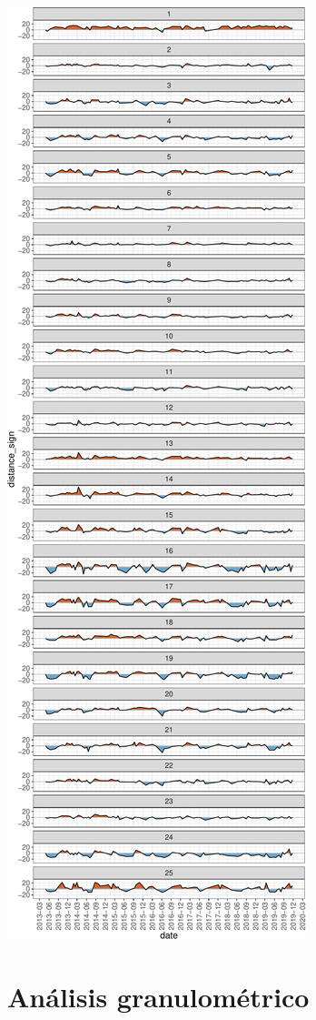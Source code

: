 \documentclass[11pt,]{article}
\begin{document}
\includegraphics{manuscrito_files/figure-latex/unnamed-chunk-5-1.pdf}

\section{Análisis granulométrico}\label{anuxe1lisis-granulomuxe9trico-2}
\end{document}
